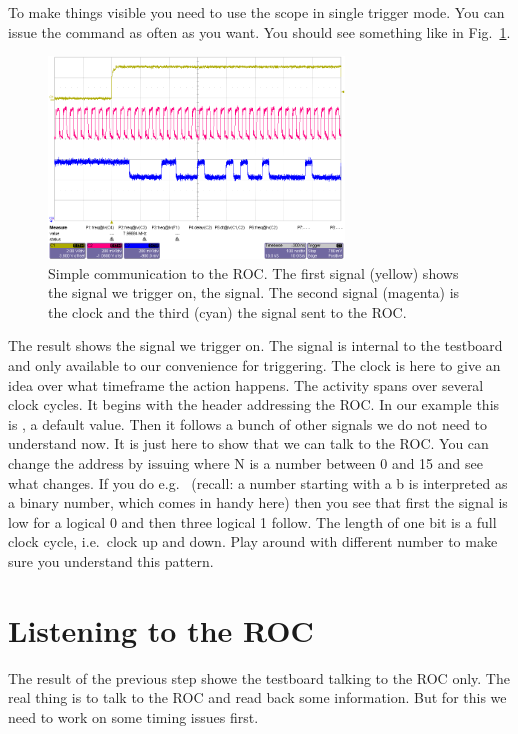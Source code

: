 \bigskip

To make things visible you need to use the scope in single trigger mode. You can issue the  command as often as you want. You should see something like in Fig.~\ref{fig:tut_scope2}.

\begin{figure}[h]
    \begin{center}
	\includegraphics[width=0.7\textwidth]{img/tut_scope2.png}
	\caption{Simple communication to the ROC. The first signal (yellow) shows the signal we trigger on, the  signal. The second signal (magenta) is the clock and the third (cyan) the signal sent to the ROC.}
	\label{fig:tut_scope2}
    \end{center}
\end{figure}

The result shows the signal we trigger on. The  signal is internal to the testboard and only available to our convenience  for triggering. The clock is here to give an idea over what timeframe the action happens. The activity spans over several clock cycles. It begins with the header addressing the ROC. In our example this is , a default value. Then it follows a bunch of other signals we do not need to understand now. It is just here to show that we can talk to the ROC. You can change the address by issuing  where N is a number between 0 and 15 and see what changes. If you do e.g.~ (recall: a number starting with a b is interpreted as a binary number, which comes in handy here) then you see that first the signal is low for a logical 0 and then three logical 1 follow. The length of one bit is a full clock cycle, i.e.~clock up and down. Play around with different number to make sure you understand this pattern.

\section{Listening to the ROC}
The result of the previous step showe the testboard talking to the ROC only. The real thing is to talk to the ROC and read back some information. But for this we need to work on some timing issues first.

